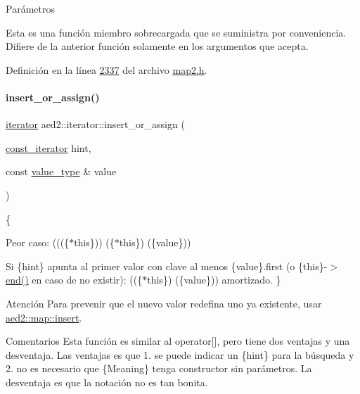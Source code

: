 \begin{DoxyParams}{\-Parámetros}
\begin{DoxyCompactItemize}
Esta es una función miembro sobrecargada que se suministra por conveniencia. Difiere de la anterior función solamente en los argumentos que acepta. 

Definición en la línea \hyperlink{map2_8h_source_l02337}{2337} del archivo \hyperlink{map2_8h_source}{map2.\+h}.

\mbox{\label{classaed2_1_1iterator_aab34e7001b3ee3ce79da8ea24d7e6351_aab34e7001b3ee3ce79da8ea24d7e6351}} 
\paragraph{\texorpdfstring{insert\+\_\+or\+\_\+assign()}{insert\_or\_assign()}\hspace{0.1cm}{\footnotesize\ttfamily [1/2]}}
{\footnotesize\ttfamily \hyperlink{classaed2_1_1iterator_1_1iterator}{iterator} aed2\+::iterator\+::insert\+\_\+or\+\_\+assign (\begin{DoxyParamCaption}\item[{\hyperlink{classaed2_1_1iterator_1_1const__iterator}{const\+\_\+iterator}}]{hint,  }\item[{const \hyperlink{classaed2_1_1iterator_a6411a2c08b2b7c52f063bef1a168acb6_a6411a2c08b2b7c52f063bef1a168acb6}{value\+\_\+type} \&}]{value }\end{DoxyParamCaption})\hspace{0.3cm}{\ttfamily [inline]}}

\{
\begin{DoxyItemize}
\item Peor caso\+: (((\{$\ast$this\}))  (\{$\ast$this\})  (\{value\}))
\item Si \{hint\} apunta al primer valor con clave al menos \{value\}.first (o \{this\}-\/$>$\hyperlink{classaed2_1_1iterator_a67caf9468be999e9be96b7add5d79946_a67caf9468be999e9be96b7add5d79946}{end()} en caso de no existir)\+: ((\{$\ast$this\})  (\{value\})) amortizado. \}
\end{DoxyItemize}

\begin{DoxyAttention}{Atención}
Para prevenir que el nuevo valor redefina uno ya existente, usar \hyperlink{classaed2_1_1map_a60aacba06b1579630b3c8e996cf248c8_a60aacba06b1579630b3c8e996cf248c8}{aed2\+::map\+::insert}. 
\end{DoxyAttention}
\begin{DoxyRemark}{Comentarios}
Esta función es similar al operator\mbox{[}\mbox{]}, pero tiene dos ventajas y una desventaja. Las ventajas es que 1. se puede indicar un \{hint\} para la búsqueda y 2. no es necesario que \{Meaning\} tenga constructor sin parámetros. La desventaja es que la notación no es tan bonita. 
\end{DoxyRemark}



\end{DoxyCompactItemize}
\end{DoxyParams}
